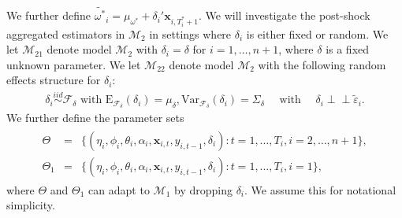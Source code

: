 \documentclass[11pt]{article}
\def\mbf#1{\mathbf{#1}} %
\newcommand{\simiid}{\stackrel{iid}{\sim}} %
\newcommand{\indep}{\perp \!\!\! \perp } %
\def\mrm#1{\mathrm{#1}} %
\def\t#1{\tilde{#1}} %
\def\mc#1{\mathcal{#1}} %
\def\mc#1{\mathcal{#1}}
\theoremstyle{definition}
\begin{document}
We further define 
$\widetilde{\omega^{*}}_i=\mu_{\omega^{*}}+\delta_i'\mbf{x}_{i, T_i^*+1}$. 
We will investigate the post-shock aggregated estimators in $\mc{M}_2$ 
in settings where $\delta_i$ is either fixed or random. 
We let $\mc{M}_{21}$ denote model $\mc{M}_{2}$ with $\delta_i = \delta$ for $i= 1, \ldots, n+1$, 
where $\delta$ is a  fixed unknown parameter.
We let $\mc{M}_{22}$ denote model $\mc{M}_{2}$ with the following random effects 
structure for $\delta_i$:
\begin{align*}
\delta_i\simiid  \mc{F}_{\delta} \text{ with }\mrm{E}_{\mc{F}_{\delta}}(\delta_i)=\mu_{\delta}, \mrm{Var}_{\mc{F}_{\delta}}(\delta_i)=\Sigma_\delta 
   \quad \text{ with } \quad  \delta_i  \indep \t{\varepsilon}_{i}.
\end{align*}
We further define the parameter sets
\begin{align}
  \begin{array}{lll}
     \Theta &= &\{(\eta_i, \phi_i, \theta_i, \alpha_i, \mbf{x}_{i,t}, y_{i,t-1}, \delta_i)\colon t= 1, \ldots, T_i, i = 2, \ldots, n +1\},\\
    \Theta_1 &= &\{(\eta_i, \phi_i, \theta_i, \alpha_i, \mbf{x}_{i,t}, y_{i,t-1}, \delta_i)\colon t= 1, \ldots, T_i, i = 1\},\label{parameter}
  \end{array}
\end{align}
where $\Theta$ and $\Theta_1$ can adapt to $\mc{M}_1$ by dropping $\delta_i$. We assume this for notational simplicity.
\end{document}
